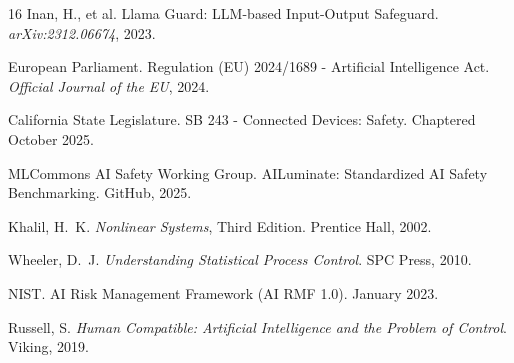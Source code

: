 \documentclass[11pt,twocolumn]{article}
\begin{document}
\begin{thebibliography}{16}
Inan, H., et al.
\newblock Llama Guard: LLM-based Input-Output Safeguard.
\newblock \emph{arXiv:2312.06674}, 2023.

European Parliament.
\newblock Regulation (EU) 2024/1689 - Artificial Intelligence Act.
\newblock \emph{Official Journal of the EU}, 2024.

California State Legislature.
\newblock SB 243 - Connected Devices: Safety.
\newblock Chaptered October 2025.

MLCommons AI Safety Working Group.
\newblock AILuminate: Standardized AI Safety Benchmarking.
\newblock GitHub, 2025.

Khalil, H.~K.
\newblock \emph{Nonlinear Systems}, Third Edition.
\newblock Prentice Hall, 2002.

Wheeler, D.~J.
\newblock \emph{Understanding Statistical Process Control}.
\newblock SPC Press, 2010.

NIST.
\newblock AI Risk Management Framework (AI RMF 1.0).
\newblock January 2023.

Russell, S.
\newblock \emph{Human Compatible: Artificial Intelligence and the Problem of Control}.
\newblock Viking, 2019.

\end{thebibliography}
\end{document}
